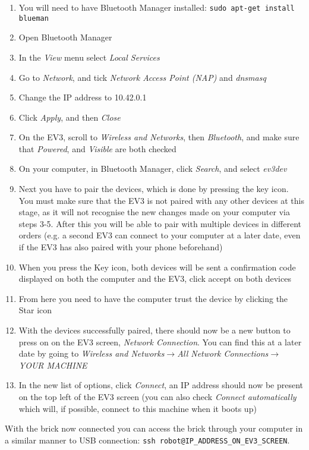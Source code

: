 \documentclass{article}
\begin{document}
\begin{enumerate}
    \item You will need to have Bluetooth Manager installed: \texttt{sudo apt-get install blueman}
    \item Open Bluetooth Manager
    \item In the \textit{View} menu select \textit{Local Services}
    \item Go to \textit{Network}, and tick \textit{Network Access Point (NAP)} and \textit{dnsmasq}
    \item Change the IP address to 10.42.0.1
    \item Click \textit{Apply}, and then \textit{Close}
    \item On the EV3, scroll to \textit{Wireless and Networks}, then \textit{Bluetooth}, and make sure that \textit{Powered}, and \textit{Visible} are both checked
    \item On your computer, in Bluetooth Manager, click \textit{Search}, and select \textit{ev3dev}
    \item Next you have to pair the devices, which is done by pressing the key icon. You must make sure that the EV3 is not paired with any other devices at this stage, as it will not recognise the new changes made on your computer via steps 3-5. After this you will be able to pair with multiple devices in different orders (e.g. a second EV3 can connect to your computer at a later date, even if the EV3 has also paired with your phone beforehand)
    \item When you press the Key icon, both devices will be sent a confirmation code displayed on both the computer and the EV3, click accept on both devices
    \item From here you need to have the computer trust the device by clicking the Star icon
    \item With the devices successfully paired, there should now be a new button to press on on the EV3 screen, \textit{Network Connection}. You can find this at a later date by going to \textit{Wireless and Networks}\(\rightarrow\)\textit{All Network Connections}\(\rightarrow\)\textit{YOUR MACHINE}
    \item In the new list of options, click \textit{Connect}, an IP address should now be present on the top left of the EV3 screen (you can also check \textit{Connect automatically} which will, if possible, connect to this machine when it boots up)
\end{enumerate}

With the brick now connected you can access the brick through your computer in a similar manner to USB connection: \texttt{ssh robot@IP\_ADDRESS\_ON\_EV3\_SCREEN}. 
\end{document}
